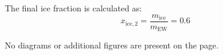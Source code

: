 The final ice fraction is calculated as:  
\[
x_{\text{ice},2} = \frac{m_{\text{ice}}}{m_{\text{EW}}} = 0.6
\]  

No diagrams or additional figures are present on the page.